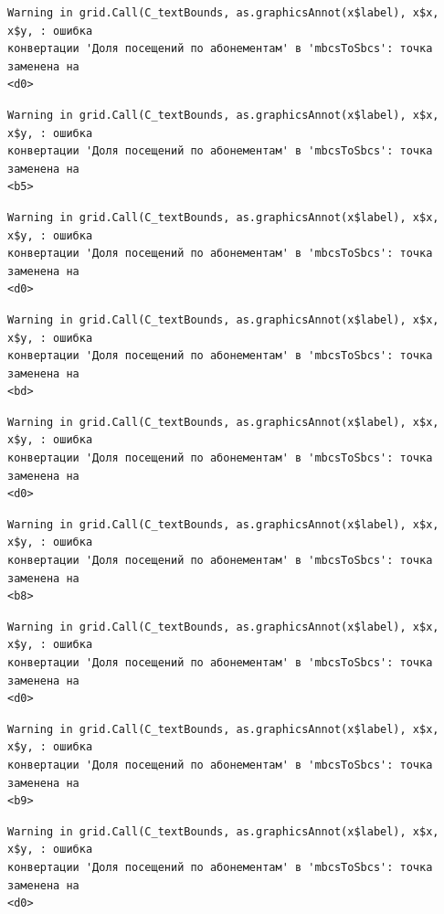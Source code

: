 \documentclass[
  letterpaper,
  DIV=11,
  numbers=noendperiod]{scrreprt}
\begin{document}
\begin{verbatim}
Warning in grid.Call(C_textBounds, as.graphicsAnnot(x$label), x$x, x$y, : ошибка
конвертации 'Доля посещений по абонементам' в 'mbcsToSbcs': точка заменена на
<d0>
\end{verbatim}

\begin{verbatim}
Warning in grid.Call(C_textBounds, as.graphicsAnnot(x$label), x$x, x$y, : ошибка
конвертации 'Доля посещений по абонементам' в 'mbcsToSbcs': точка заменена на
<b5>
\end{verbatim}

\begin{verbatim}
Warning in grid.Call(C_textBounds, as.graphicsAnnot(x$label), x$x, x$y, : ошибка
конвертации 'Доля посещений по абонементам' в 'mbcsToSbcs': точка заменена на
<d0>
\end{verbatim}

\begin{verbatim}
Warning in grid.Call(C_textBounds, as.graphicsAnnot(x$label), x$x, x$y, : ошибка
конвертации 'Доля посещений по абонементам' в 'mbcsToSbcs': точка заменена на
<bd>
\end{verbatim}

\begin{verbatim}
Warning in grid.Call(C_textBounds, as.graphicsAnnot(x$label), x$x, x$y, : ошибка
конвертации 'Доля посещений по абонементам' в 'mbcsToSbcs': точка заменена на
<d0>
\end{verbatim}

\begin{verbatim}
Warning in grid.Call(C_textBounds, as.graphicsAnnot(x$label), x$x, x$y, : ошибка
конвертации 'Доля посещений по абонементам' в 'mbcsToSbcs': точка заменена на
<b8>
\end{verbatim}

\begin{verbatim}
Warning in grid.Call(C_textBounds, as.graphicsAnnot(x$label), x$x, x$y, : ошибка
конвертации 'Доля посещений по абонементам' в 'mbcsToSbcs': точка заменена на
<d0>
\end{verbatim}

\begin{verbatim}
Warning in grid.Call(C_textBounds, as.graphicsAnnot(x$label), x$x, x$y, : ошибка
конвертации 'Доля посещений по абонементам' в 'mbcsToSbcs': точка заменена на
<b9>
\end{verbatim}

\begin{verbatim}
Warning in grid.Call(C_textBounds, as.graphicsAnnot(x$label), x$x, x$y, : ошибка
конвертации 'Доля посещений по абонементам' в 'mbcsToSbcs': точка заменена на
<d0>
\end{verbatim}
\end{document}
